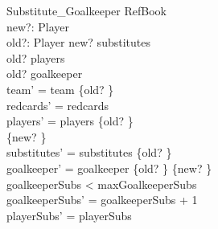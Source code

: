 \begin{schema}{Substitute\_Goalkeeper}
  \Delta RefBook\\
   new?: Player \\
   old?: Player
\where
  new? \in substitutes \\
  old? \in players \\
  old? \in goalkeeper \\
    team' = team \setminus \{old? \}\\
    redcards' = redcards\\
   players' = players \setminus \{old? \} \\\cup \{new? \}\\
   substitutes' = substitutes \setminus \{old? \}\\ 
   goalkeeper' = goalkeeper \setminus \{old? \} \cup \{new? \} \\
   goalkeeperSubs < maxGoalkeeperSubs\\
   goalkeeperSubs' = goalkeeperSubs + 1   \\
   playerSubs' =  playerSubs \\
\end{schema} 

